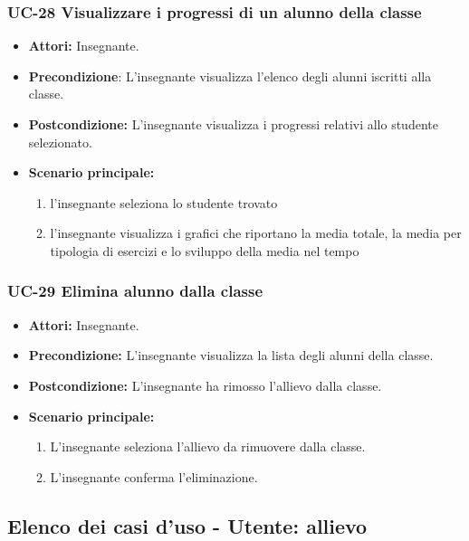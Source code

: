 \subsubsection{UC-28 Visualizzare i progressi di un alunno della classe}
\begin{itemize}
	\item \textbf{Attori:} Insegnante.
	\item \textbf{Precondizione}: L'insegnante visualizza l'elenco degli alunni iscritti alla classe.
	\item \textbf{Postcondizione:} L'insegnante visualizza i progressi relativi allo studente selezionato.
	\item \textbf{Scenario principale:}
	\begin{enumerate}
		\item l'insegnante seleziona lo studente trovato
		\item l'insegnante visualizza i grafici che riportano la media totale, la media per tipologia di esercizi e lo sviluppo della media nel tempo
	\end{enumerate}
\end{itemize}

\subsubsection{UC-29 Elimina alunno dalla classe}		
\begin{itemize}
	\item \textbf{Attori:} Insegnante.
	\item \textbf{Precondizione:} L'insegnante visualizza la lista degli alunni della classe.
	\item \textbf{Postcondizione:} L'insegnante ha rimosso l'allievo dalla classe.
	\item \textbf{Scenario principale:}
	\begin{enumerate}
		\item L'insegnante seleziona l'allievo da rimuovere dalla classe.
		\item L'insegnante conferma l'eliminazione.
	\end{enumerate}	
\end{itemize}


\subsection{Elenco dei casi d'uso - Utente: allievo}

